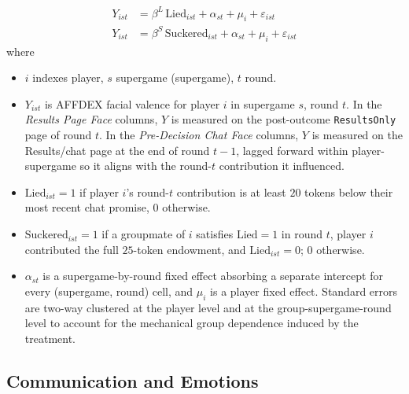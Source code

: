 \documentclass[12pt,letterpaper,english]{article}
\begin{document}
\begin{align}
    Y_{ist} &= \beta^{L}\, \text{Lied}_{ist} + \alpha_{st} + \mu_i + \varepsilon_{ist} \label{eq:gap_lied}\\
    Y_{ist} &= \beta^{S}\, \text{Suckered}_{ist} + \alpha_{st} + \mu_i + \varepsilon_{ist} \label{eq:gap_suckered}
\end{align}
\noindent where
\begin{itemize}\setlength\itemsep{0pt}
    \item $i$ indexes player, $s$ supergame (supergame), $t$ round.
    \item $Y_{ist}$ is AFFDEX facial valence for player $i$ in supergame $s$, round $t$. In the \emph{Results Page Face} columns, $Y$ is measured on the post-outcome \texttt{ResultsOnly} page of round $t$. In the \emph{Pre-Decision Chat Face} columns, $Y$ is measured on the Results/chat page at the end of round $t{-}1$, lagged forward within player-supergame so it aligns with the round-$t$ contribution it influenced.
    \item $\text{Lied}_{ist} = 1$ if player $i$'s round-$t$ contribution is at least $20$ tokens below their most recent chat promise, $0$ otherwise.
    \item $\text{Suckered}_{ist} = 1$ if a groupmate of $i$ satisfies $\text{Lied} = 1$ in round $t$, player $i$ contributed the full $25$-token endowment, and $\text{Lied}_{ist} = 0$; $0$ otherwise.
    \item $\alpha_{st}$ is a supergame-by-round fixed effect absorbing a separate intercept for every (supergame, round) cell, and $\mu_i$ is a player fixed effect. Standard errors are two-way clustered at the player level and at the group-supergame-round level to account for the mechanical group dependence induced by the  treatment.
\end{itemize}

\begin{table}[htbp]
    \centering
    \caption{Facial Valence Regressions: Liars and Suckers}
    \label{table:valence_sentiment_gap}
    
\end{table}

\subsection{Communication and Emotions}
\end{document}
